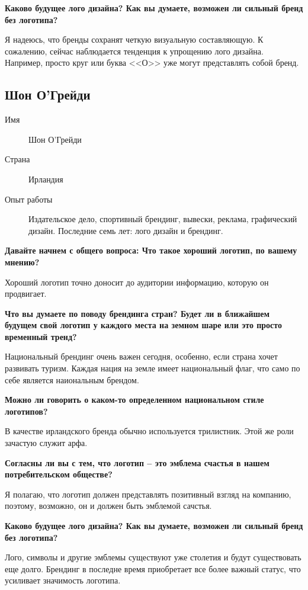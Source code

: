 \textbf{Каково будущее лого дизайна? Как вы думаете, возможен ли сильный бренд без логотипа?}

Я надеюсь, что бренды сохранят четкую визуальную составляющую. К сожалению, сейчас наблюдается тенденция к упрощению лого дизайна. Например, просто круг или буква <<О>> уже могут представлять собой бренд.



\clearpage
\subsection{Шон О'Грейди}

\begin{description}
\item[Имя] Шон О'Грейди
\item[Страна] Ирландия
\item[Опыт работы] Издательское дело, спортивный брендинг, вывески, реклама, графический дизайн. Последние семь лет: лого дизайн и брендинг.
\end{description}

\textbf{Давайте начнем с общего вопроса: Что такое хороший логотип, по вашему мнению?}

Хороший логотип точно доносит до аудитории информацию, которую он продвигает.


\textbf{Что вы думаете по поводу брендинга стран? Будет ли в ближайшем будущем свой логотип у каждого места на земном шаре или это просто временный тренд?}

Национальный брендинг очень важен сегодня, особенно, если страна хочет развивать туризм. Каждая нация на земле имеет национальный флаг, что само по себе является наиональным брендом.


\textbf{Можно ли говорить о каком-то определенном национальном стиле логотипов?}

В качестве ирландского бренда обычно используется трилистник. Этой же роли зачастую служит арфа.


\textbf{Согласны ли вы с тем, что логотип – это эмблема счастья в нашем потребительском обществе?}

Я полагаю, что логотип должен представлять позитивный взгляд на компанию, поэтому, возможно, он и должен быть эмблемой сачстья.


\textbf{Каково будущее лого дизайна? Как вы думаете, возможен ли сильный бренд без логотипа?}

Лого, символы и другие эмблемы существуют уже столетия и будут существовать еще долго. Брендинг в последне время приобретает все более важный статус, что усиливает значимость  логотипа.


